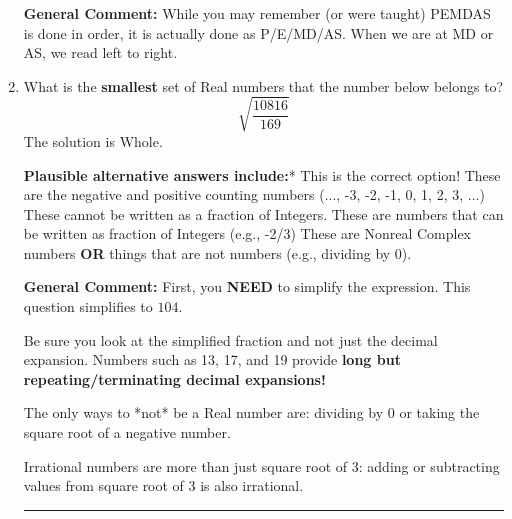 \documentclass{extbook}[14pt]
\newcommand{\litem}[1]{\item #1

\rule{\textwidth}{0.4pt}}
\begin{document}
\begin{enumerate}
{\textbf{General Comment:} While you may remember (or were taught) PEMDAS is done in order, it is actually done as P/E/MD/AS. When we are at MD or AS, we read left to right.
}
\litem{
What is the \textbf{smallest} set of Real numbers that the number below belongs to?
\[ \sqrt{\frac{10816}{169}} \]The solution is \( \text{Whole} \).\begin{enumerate}[label=\Alph*.]
\textbf{Plausible alternative answers include:}* This is the correct option!
These are the negative and positive counting numbers (..., -3, -2, -1, 0, 1, 2, 3, ...)
These cannot be written as a fraction of Integers.
These are numbers that can be written as fraction of Integers (e.g., -2/3)
These are Nonreal Complex numbers \textbf{OR} things that are not numbers (e.g., dividing by 0).
\end{enumerate}

\textbf{General Comment:} First, you \textbf{NEED} to simplify the expression. This question simplifies to $104$. 
 
 Be sure you look at the simplified fraction and not just the decimal expansion. Numbers such as 13, 17, and 19 provide \textbf{long but repeating/terminating decimal expansions!} 
 
 The only ways to *not* be a Real number are: dividing by 0 or taking the square root of a negative number. 
 
 Irrational numbers are more than just square root of 3: adding or subtracting values from square root of 3 is also irrational.
}
\end{enumerate}
\end{document}
